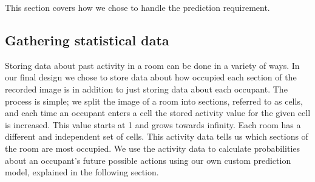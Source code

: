 This section covers how we chose to handle the prediction requirement.

\subsection{Gathering statistical data}
\label{ssub:statisticaldata}
Storing data about past activity in a room can be done in a variety of ways. In our final design we chose to store data about how occupied each section of the recorded image is in addition to just storing data about each occupant. The process is simple; we split the image of a room into sections, referred to as cells, and each time an occupant enters a cell the stored activity value for the given cell is increased. This value starts at 1 and grows towards infinity. Each room has a different and independent set of cells. This activity data tells us which sections of the room are most occupied. We use the activity data to calculate probabilities about an occupant's future possible actions using our own custom prediction model, explained in the following section.

